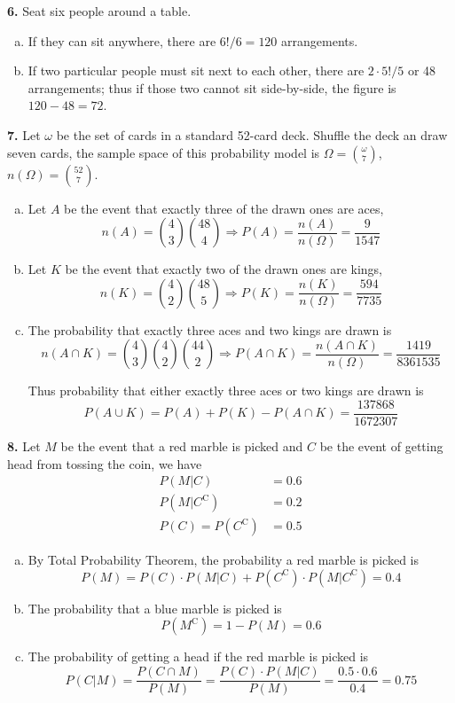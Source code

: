 \documentclass[a4paper,12pt]{article}
\newcommand{\C}{\mathrm C}
\newcommand{\exercise}[1]{\noindent\textbf{#1.}}
\begin{document}
\exercise 6  Seat six people around a table.
\begin{enumerate}[(a)]
  \item If they can sit anywhere, there are $6!/6 = 120$ arrangements.
  \item If two particular people must sit next to each other,
    there are $2\cdot 5!/5$ or 48 arrangements; thus if those two cannot
    sit side-by-side, the figure is $120 - 48 = 72$.
\end{enumerate}

\exercise 7  Let $\omega$ be the set of cards in a standard 52-card deck.
Shuffle the deck an draw seven cards,
the sample space of this probability model is $\Omega = \binom{\omega}{7}$,
$n(\Omega) = \binom{52}{7}$.
\begin{enumerate}[(a)]
  \item Let $A$ be the event that exactly three of the drawn ones are aces,
    \[n(A) = \binom{4}{3}\binom{48}{4}
    \Longrightarrow P(A) = \frac{n(A)}{n(\Omega)} = \frac{9}{1547}\]
  \item Let $K$ be the event that exactly two of the drawn ones are kings,
    \[n(K) = \binom{4}{2}\binom{48}{5}
    \Longrightarrow P(K) = \frac{n(K)}{n(\Omega)} = \frac{594}{7735}\]
  \item The probability that exactly three aces and two kings are drawn is
    \[n(A\cap K) = \binom{4}{3}\binom{4}{2}\binom{44}{2}
    \Longrightarrow P(A\cap K) = \frac{n(A\cap K)}{n(\Omega)}
    = \frac{1419}{8361535}\]

    Thus probability that either exactly three aces or two kings are drawn is
    \[P(A\cup K) = P(A) + P(K) - P(A\cap K) = \frac{137868}{1672307}\]
\end{enumerate}

\exercise 8  Let $M$ be the event that a red marble is picked
and $C$ be the event of getting head from tossing the coin, we have
\begin{align*}
  P(M|C) &= 0.6\\
  P\left(M|C^\C\right) &= 0.2\\
  P(C) = P\left(C^\C\right) &= 0.5
\end{align*}

\begin{enumerate}[(a)]
  \item By Total Probability Theorem, the probability a red marble is picked is
    \[P(M) = P(C)\cdot P(M|C) + P\left(C^\C\right)\cdot P\left(M|C^\C\right)
    = 0.4\]
  \item The probability that a blue marble is picked is
    \[P\left(M^\C\right) = 1 - P(M) = 0.6\]
  \item The probability of getting a head if the red marble is picked is
    \[P(C|M) = \frac{P(C\cap M)}{P(M)} = \frac{P(C)\cdot P(M|C)}{P(M)}
    = \frac{0.5\cdot 0.6}{0.4} = 0.75\]
\end{enumerate}
\end{document}
